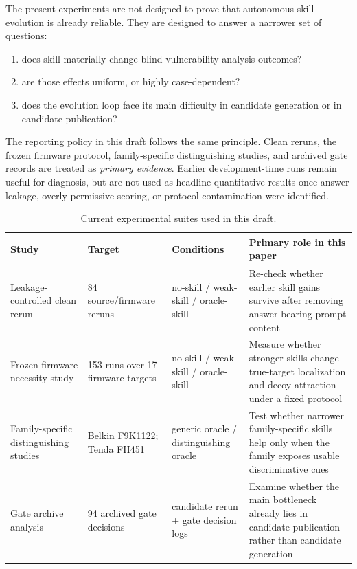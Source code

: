 \documentclass[11pt]{article}
\begin{document}
The present experiments are not designed to prove that autonomous skill evolution is
already reliable.  They are designed to answer a narrower set of questions:
\begin{enumerate}[leftmargin=*]
    \item does skill materially change blind vulnerability-analysis outcomes?
    \item are those effects uniform, or highly case-dependent?
    \item does the evolution loop face its main difficulty in candidate generation or in
    candidate publication?
\end{enumerate}

The reporting policy in this draft follows the same principle.  Clean reruns, the
frozen firmware protocol, family-specific distinguishing studies, and archived gate
records are treated as \emph{primary evidence}.  Earlier development-time runs remain
useful for diagnosis, but are not used as headline quantitative results once answer
leakage, overly permissive scoring, or protocol contamination were identified.

\begin{table}[t]
\centering
\caption{Current experimental suites used in this draft.}
\label{tab:arxiv_experiment_suites}
\scriptsize
\begin{tabular}{p{} p{} p{} p{}}
\toprule
Study & Target & Conditions & Primary role in this paper \\
\midrule
Leakage-controlled clean rerun & 84 source/firmware reruns & no-skill / weak-skill / oracle-skill & Re-check whether earlier skill gains survive after removing answer-bearing prompt content \\
Frozen firmware necessity study & 153 runs over 17 firmware targets & no-skill / weak-skill / oracle-skill & Measure whether stronger skills change true-target localization and decoy attraction under a fixed protocol \\
Family-specific distinguishing studies & Belkin F9K1122; Tenda FH451 & generic oracle / distinguishing oracle & Test whether narrower family-specific skills help only when the family exposes usable discriminative cues \\
Gate archive analysis & 94 archived gate decisions & candidate rerun + gate decision logs & Examine whether the main bottleneck already lies in candidate publication rather than candidate generation \\
\bottomrule
\end{tabular}
\end{table}
\end{document}
